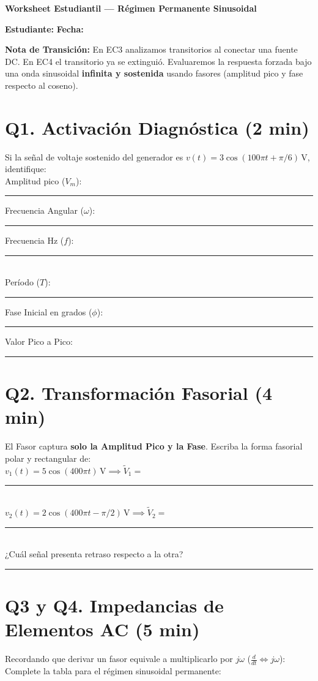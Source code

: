 \documentclass[11pt, a4paper]{article}
\begin{document}
\begin{tcolorbox}[colback=ucbblue!5!white, colframe=ucbblue, title=\textbf{Artefacto A3: Introducción a EC4 (Fasores, Impedancia y Senoides)}]
    \centering \textbf{Worksheet Estudiantil — Régimen Permanente Sinusoidal}
\end{tcolorbox}

\textbf{Estudiante:} \hrulefill \quad \textbf{Fecha:} \hrulefill

\vspace{0.2cm}
\noindent \textbf{Nota de Transición:} En EC3 analizamos transitorios al conectar una fuente DC. En EC4 el transitorio ya se extinguió. Evaluaremos la respuesta forzada bajo una onda sinusoidal \textbf{infinita y sostenida} usando fasores (amplitud pico y fase respecto al coseno).

\section*{Q1. Activación Diagnóstica (2 min)}
Si la señal de voltaje sostenido del generador es $v(t) = 3\cos(100\pi t + \pi/6)\,\text{V}$, identifique: \\
Amplitud pico ($V_m$): \rule{2cm}{0.4pt} \quad Frecuencia Angular ($\omega$): \rule{2cm}{0.4pt} \quad Frecuencia Hz ($f$): \rule{2cm}{0.4pt} \\
Período ($T$): \rule{2cm}{0.4pt} \quad Fase Inicial en grados ($\phi$): \rule{2cm}{0.4pt} \quad Valor Pico a Pico: \rule{2cm}{0.4pt}

\section*{Q2. Transformación Fasorial (4 min)}
El Fasor captura \textbf{solo la Amplitud Pico y la Fase}. Escriba la forma fasorial polar y rectangular de: \\
$v_1(t) = 5\cos(400\pi t)\,\text{V} \implies \tilde{V}_1 = $ \rule{6cm}{0.4pt} \\
$v_2(t) = 2\cos(400\pi t - \pi/2)\,\text{V} \implies \tilde{V}_2 = $ \rule{6cm}{0.4pt} \\
¿Cuál señal presenta retraso respecto a la otra? \rule{6cm}{0.4pt}

\section*{Q3 y Q4. Impedancias de Elementos AC (5 min)}
Recordando que derivar un fasor equivale a multiplicarlo por $j\omega$ ($\frac{d}{dt} \iff j\omega$): \\
Complete la tabla para el régimen sinusoidal permanente:
\end{document}
